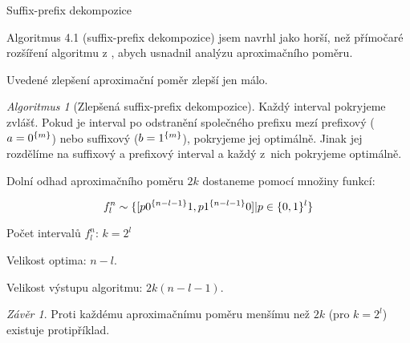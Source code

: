 \documentclass{beamer}
\theoremstyle{remark}
\newtheorem{algorithm}{Algoritmus}
\newtheorem{conclusion}{Závěr}
\begin{document}
\begin{frame}{Suffix-prefix dekompozice}

Algoritmus 4.1 (suffix-prefix dekompozice) jsem navrhl jako horší, než přímočaré rozšíření algoritmu z \citet{Schieber2005154}, abych usnadnil analýzu aproximačního poměru.

Uvedené zlepšení aproximační poměr zlepší jen málo.

\begin{algorithm}[Zlepšená suffix-prefix dekompozice]
Každý interval pokryjeme zvlášť.
Pokud je interval po odstranění společného prefixu mezí prefixový ($a = 0^{\{m\}}$) nebo suffixový ($b = 1^{\{m\}}$), pokryjeme jej optimálně.
Jinak jej rozdělíme na suffixový a prefixový interval a každý z~nich pokryjeme optimálně.
\end{algorithm}


Dolní odhad aproximačního poměru $2k$ dostaneme pomocí množiny  funkcí:

$$
f_l^n \sim \{[p 0^{\{n-l-1\}} 1, p 1^{\{n-l-1\}} 0] | p \in \{0, 1\}^l\}
$$

Počet intervalů $f_l^n$: $k = 2^l$

Velikost optima: $n-l$.

Velikost výstupu algoritmu: $2k (n-l-1)$.

\begin{conclusion}
Proti každému aproximačnímu poměru menšímu než $2k$ (pro $k = 2^l$) existuje protipříklad.
\end{conclusion}
\end{frame}
\end{document}
